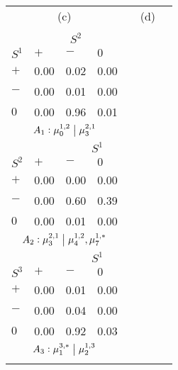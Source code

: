 \documentclass[3p,times,preprint]{elsarticle}
\begin{document}
\begin{figure}[t!]
\begin{tabularx}{0.98\textwidth}{XXXXp{0.4cm}>{\centering\arraybackslash}p{3.8cm}p{0.4cm}}
    \multicolumn{4}{c}{(c)}
    & &
    \rule{0pt}{14pt}(d)\\
     \\
    {
     \footnotesize
    \begin{tabular}[t!]{lccc}

     & \multicolumn{3}{c}{$S^2$}\\
     \cmidrule{2-4}
    $S^1$ & $+$ & $-$ & $0$  \\
     \midrule
    $+$ & 0.00 & 0.02 & 0.00\\
    $-$ & 0.00 & 0.01 & 0.00\\
    $0$ & 0.00 & 0.96 & 0.01\\
     \midrule
          \multicolumn{4}{c}{$A_1:\mu_0^{1,2} \;\big\vert \;  \mu_3^{2,1}$}\\

     \end{tabular}
     }
     &{
     \footnotesize
    \begin{tabular}[t!]{lccc}
     & \multicolumn{3}{c}{$S^1$}\\
     \cmidrule{2-4}
    $S^2$ & $+$ & $-$ & $0$  \\
     \midrule
    $+$ & 0.00 & 0.00 & 0.00\\
    $-$ & 0.00 & 0.60 & 0.39\\
    $0$ & 0.00 & 0.01 & 0.00\\
     \midrule
     \multicolumn{4}{c}{$A_2:\mu_3^{2,1} \;\big\vert \;  \mu_4^{1,2},\mu_7^{1,*} $}\\

     \end{tabular}
     }
     &{
     \footnotesize
    \begin{tabular}[t!]{lccc}
     & \multicolumn{3}{c}{$S^1$}\\
     \cmidrule{2-4}
   $S^3$ & $+$ & $-$ & $0$  \\
\midrule
    $+$ & 0.00 & 0.01 & 0.00\\
    $-$ & 0.00 & 0.04 & 0.00\\
    $0$ & 0.00 & 0.92 & 0.03\\
     \midrule
    \multicolumn{4}{c}{$A_3:\mu_1^{3,*} \;\big\vert \;  \mu_2^{1,3} $}\\


\end{tabular}}
\end{tabularx}
\end{figure}
\end{document}
